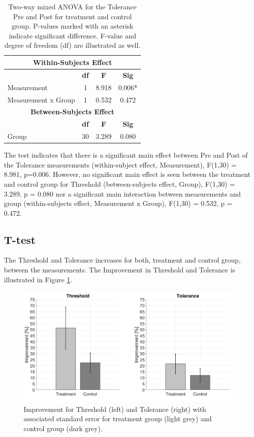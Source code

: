 \begin{table}[ht]
\caption{Two-way mixed ANOVA for the Tolerance Pre and Post for treatment and control group. P-values marked with an asterisk indicate significant difference. F-value and degree of
freedom (df) are illustrated as well.}
\centering
\begin{tabular}{l c c c}
\toprule
\multicolumn{4}{c}{\textbf{Within-Subjects Effect}} \\
\midrule  
& \textbf{df} & \textbf{F} & \textbf{Sig} \\ [0.5ex] %
Measurement & 1 &  8.918 &  0.006* \\
Measurement x Group & 1 & 0.532 & 0.472 \\
\toprule
\multicolumn{4}{c}{\textbf{Between-Subjects Effect}} \\
\midrule
 & \textbf{df} & \textbf{F} & \textbf{Sig} \\ [0.5ex] %
Group & 30 & 3.289 &  0.080 \\
\hline
\end{tabular}
\label{table:TWOWAYANOVA2}
\end{table}

\noindent
The test indicates that there is a significant main effect between Pre and Post of the Tolerance measurements (within-subject effect, Measurement), F(1,30) = 8.981, p=0.006. However, no significant main effect is seen between the treatment and control group for Threshold (between-subjects effect, Group), F(1,30) = 3.289, p = 0.080 nor a significant main interaction between  measurements and group (within-subjects effect, Measurement x Group), F(1,30) = 0.532, p = 0.472.

\subsection{T-test}
The Threshold and Tolerance increases for both, treatment and control group, between the measurements. The Improvement in Threshold and Tolerance is illustrated in Figure \ref{fig:barplot}. 

\begin{figure}[H]
\centering
\includegraphics[width=1\columnwidth]{../figures/barplot.png}
\caption{Improvement for Threshold (left) and Tolerance (right) with associated standard error for treatment group (light grey) and control group (dark grey).}
\label{fig:barplot}
\end{figure} 

